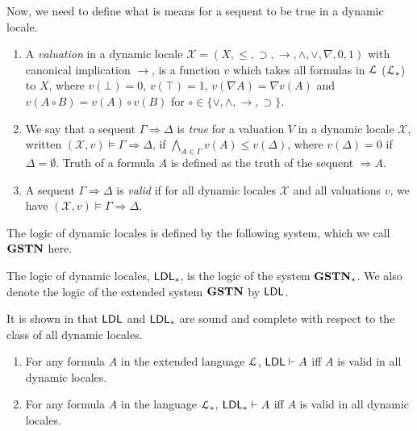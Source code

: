   Now, we need to define what is means for a sequent to be true in a dynamic locale.
  \begin{dfn}\quad
    \begin{enumerate}
      \item A \emph{valuation} in a dynamic locale $\mathcal{X} = (X, \le, \supset, \rightarrow, \wedge, \vee, \nabla, 0, 1)$ with canonical implication $\rightarrow$, is a function $v$ which takes all formulas in $\mathcal{L}$ ($\mathcal{L}_*$) to $X$, where $v(\bot) = 0$, $v(\top) = 1$, $v(\nabla A) = \nabla v(A)$ and  $v(A \circ B) = v(A) \circ v(B)$ for $\circ \in \{\vee, \wedge, \rightarrow, \supset\}$.
      \item We say that a sequent $\Gamma \Rightarrow \Delta$ is \emph{true} for a valuation $V$ in a dynamic locale $\mathcal{X}$, written $(\mathcal{X}, v) \vDash \Gamma \Rightarrow \Delta$, if $\bigwedge_{A \in \Gamma} v(A) \le v(\Delta)$, where $v(\Delta) = 0$ if $\Delta = \emptyset$. Truth of a formula $A$ is defined as the truth of the sequent $\Rightarrow A$.
      \item A sequent $\Gamma \Rightarrow \Delta$ is \emph{valid} if for all dynamic locales $\mathcal{X}$ and all valuations $v$, we have $(\mathcal{X}, v) \vDash \Gamma \Rightarrow \Delta$.
    \end{enumerate}
  \end{dfn}
  
  The logic of dynamic locales is defined by the following system, which we call $\mathbf{GSTN}$ here.
  

  The logic of dynamic locales, $\mathsf{LDL}_*$, is the logic of the system $\mathbf{GSTN}_*$. We also denote the logic of the extended system $\mathbf{GSTN}$ by $\mathsf{LDL}$.
  
  It is shown in \cite{amir} that $\mathsf{LDL}$ and $\mathsf{LDL}_*$ are sound and complete with respect to the class of all dynamic locales.
  \begin{thm} \quad
    \begin{enumerate}
      \item For any formula $A$ in the extended language $\mathcal{L}$, $\mathsf{LDL} \vdash A$ iff $A$ is valid in all dynamic locales.
      \item For any formula $A$ in the language $\mathcal{L}_*$, $\mathsf{LDL}_* \vdash A$ iff $A$ is valid in all dynamic locales.
    \end{enumerate}
  \end{thm}
  